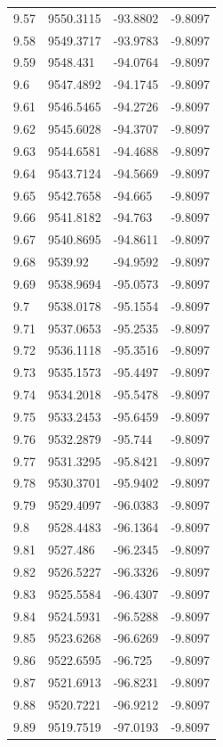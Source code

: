 \begin{table}[H]
\begin{tabular}{llll}
9.57 & 9550.3115 & -93.8802 & -9.8097 \\
9.58 & 9549.3717 & -93.9783 & -9.8097 \\
9.59 & 9548.431 & -94.0764 & -9.8097 \\
9.6 & 9547.4892 & -94.1745 & -9.8097 \\
9.61 & 9546.5465 & -94.2726 & -9.8097 \\
9.62 & 9545.6028 & -94.3707 & -9.8097 \\
9.63 & 9544.6581 & -94.4688 & -9.8097 \\
9.64 & 9543.7124 & -94.5669 & -9.8097 \\
9.65 & 9542.7658 & -94.665 & -9.8097 \\
9.66 & 9541.8182 & -94.763 & -9.8097 \\
9.67 & 9540.8695 & -94.8611 & -9.8097 \\
9.68 & 9539.92 & -94.9592 & -9.8097 \\
9.69 & 9538.9694 & -95.0573 & -9.8097 \\
9.7 & 9538.0178 & -95.1554 & -9.8097 \\
9.71 & 9537.0653 & -95.2535 & -9.8097 \\
9.72 & 9536.1118 & -95.3516 & -9.8097 \\
9.73 & 9535.1573 & -95.4497 & -9.8097 \\
9.74 & 9534.2018 & -95.5478 & -9.8097 \\
9.75 & 9533.2453 & -95.6459 & -9.8097 \\
9.76 & 9532.2879 & -95.744 & -9.8097 \\
9.77 & 9531.3295 & -95.8421 & -9.8097 \\
9.78 & 9530.3701 & -95.9402 & -9.8097 \\
9.79 & 9529.4097 & -96.0383 & -9.8097 \\
9.8 & 9528.4483 & -96.1364 & -9.8097 \\
9.81 & 9527.486 & -96.2345 & -9.8097 \\
9.82 & 9526.5227 & -96.3326 & -9.8097 \\
9.83 & 9525.5584 & -96.4307 & -9.8097 \\
9.84 & 9524.5931 & -96.5288 & -9.8097 \\
9.85 & 9523.6268 & -96.6269 & -9.8097 \\
9.86 & 9522.6595 & -96.725 & -9.8097 \\
9.87 & 9521.6913 & -96.8231 & -9.8097 \\
9.88 & 9520.7221 & -96.9212 & -9.8097 \\
9.89 & 9519.7519 & -97.0193 & -9.8097 \\

\end{tabular}
\end{table}
